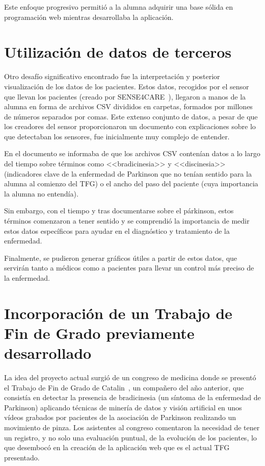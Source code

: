 Este enfoque progresivo permitió a la alumna adquirir una base sólida en programación web mientras desarrollaba la aplicación.



\section{Utilización de datos de terceros}
Otro desafío significativo encontrado fue la interpretación y posterior visualización de los datos de los pacientes. Estos datos, recogidos por el sensor que llevan los pacientes (creado por SENSE4CARE~\cite{sense4care}), llegaron a manos de la alumna en forma de archivos CSV divididos en carpetas, formados por millones de números separados por comas. Este extenso conjunto de datos, a pesar de que los creadores del sensor proporcionaron un documento con explicaciones sobre lo que detectaban los sensores, fue inicialmente muy complejo de entender.

En el documento se informaba de que los archivos CSV contenían datos a lo largo del tiempo sobre términos como <<bradicinesia>> y <<discinesia>> (indicadores clave de la enfermedad de Parkinson que no tenían sentido para la alumna al comienzo del TFG) o el ancho del paso del paciente (cuya importancia la alumna no entendía).

Sin embargo, con el tiempo y tras documentarse sobre el párkinson, estos términos comenzaron a tener sentido y se comprendió la importancia de medir estos datos específicos para ayudar en el diagnóstico y tratamiento de la enfermedad.

Finalmente, se pudieron generar gráficos útiles a partir de estos datos, que servirán tanto a médicos como a pacientes para llevar un control más preciso de la enfermedad.



\section{Incorporación de un Trabajo de Fin de Grado previamente desarrollado}
La idea del proyecto actual surgió de un congreso de medicina donde se presentó el Trabajo de Fin de Grado de Catalin~\cite{TFGCatalin}, un compañero del año anterior, que consistía en detectar la presencia de bradicinesia (un síntoma de la enfermedad de Parkinson) aplicando técnicas de minería de datos y visión artificial en unos vídeos grabados por pacientes de la asociación de Parkinson realizando un movimiento de pinza. Los asistentes al congreso comentaron la necesidad de tener un registro, y no solo una evaluación puntual, de la evolución de los pacientes, lo que desembocó en la creación de la aplicación web que es el actual TFG presentado.
 
